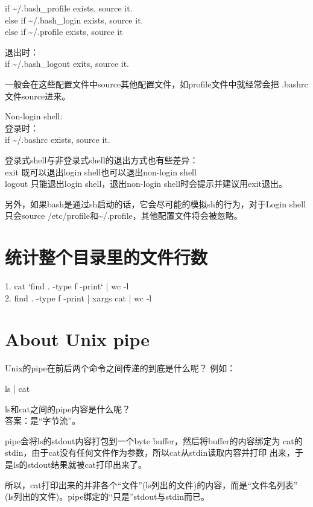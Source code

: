 ﻿\documentclass[a4paper,11pt]{article}
\begin{document}
  if \~{}/.bash\_profile exists, source it.\\
  else if \~{}/.bash\_login exists, source it.\\
  else if \~{}/.profile exists, source it

  退出时：\\
  if \~{}/.bash\_logout exits, source it.

  一般会在这些配置文件中source其他配置文件，如profile文件中就经常会把
  .bashrc文件source进来。

  Non-login shell:\\
  登录时：\\
  if \~{}/.bashrc exists, source it.

  登录式shell与非登录式shell的退出方式也有些差异：\\

  exit 既可以退出login shell也可以退出non-login shell\\
  logout 只能退出login shell，退出non-login shell时会提示并建议用exit退出。

  另外，如果bash是通过sh启动的话，它会尽可能的模拟sh的行为，对于Login shell
  只会source /etc/profile和\~{}/.profile，其他配置文件将会被忽略。


  \section[统计整个目录里的文件行数]{统计整个目录里的文件行数}
  1. cat `find . -type f -print` | wc -l\\
  2. find . -type f -print | xargs cat | wc -l

  \section[About Unix Pipe]{About Unix pipe}
  Unix的pipe在前后两个命令之间传递的到底是什么呢？
  例如：

  \begin{bashcode}
    ls | cat
  \end{bashcode}

  ls和cat之间的pipe内容是什么呢？\\
  答案：是“字节流”。

  pipe会将ls的stdout内容打包到一个byte buffer，然后将buffer的内容绑定为
  cat的stdin，由于cat没有任何文件作为参数，所以cat从stdin读取内容并打印
  出来，于是ls的stdout结果就被cat打印出来了。

  所以，cat打印出来的并非各个“文件”(ls列出的文件)的内容，而是“文件名列表”
  (ls列出的文件)。pipe绑定的“只是”stdout与stdin而已。
\end{document}
